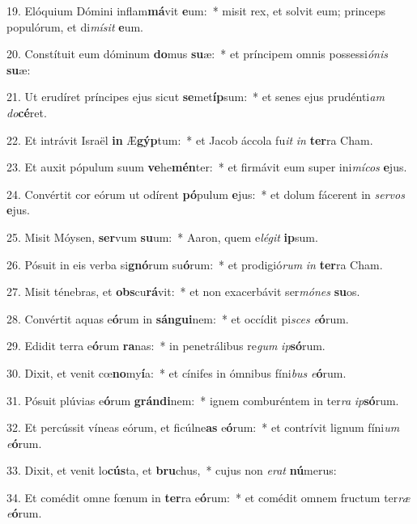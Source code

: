19. Elóquium Dómini inflam\textbf{má}vit \textbf{e}um:~*  misit rex, et solvit eum; princeps populórum, et di\textit{mí}\textit{sit} \textbf{e}um.\

20. Constítuit eum dóminum \textbf{do}mus \textbf{su}æ:~*  et príncipem omnis possessi\textit{ó}\textit{nis} \textbf{su}æ:\

21. Ut erudíret príncipes ejus sicut \textbf{se}met\textbf{íp}sum:~*  et senes ejus prudénti\textit{am} \textit{do}\textbf{cé}ret.\

22. Et intrávit Israël \textbf{in} Æ\textbf{gýp}tum:~*  et Jacob áccola fu\textit{it} \textit{in} \textbf{ter}ra Cham.\

23. Et auxit pópulum suum \textbf{ve}he\textbf{mén}ter:~*  et firmávit eum super ini\textit{mí}\textit{cos} \textbf{e}jus.\

24. Convértit cor eórum ut odírent \textbf{pó}pulum \textbf{e}jus:~*  et dolum fácerent in \textit{ser}\textit{vos} \textbf{e}jus.\

25. Misit Móysen, \textbf{ser}vum \textbf{su}um:~*  Aaron, quem e\textit{lé}\textit{git} \textbf{ip}sum.\

26. Pósuit in eis verba si\textbf{gnó}rum su\textbf{ó}rum:~*  et prodigió\textit{rum} \textit{in} \textbf{ter}ra Cham.\

27. Misit ténebras, et \textbf{obs}cu\textbf{rá}vit:~*  et non exacerbávit ser\textit{mó}\textit{nes} \textbf{su}os.\

28. Convértit aquas e\textbf{ó}rum in \textbf{sán}\textbf{gui}nem:~*  et occídit pi\textit{sces} \textit{e}\textbf{ó}rum.\

29. Edidit terra e\textbf{ó}rum \textbf{ra}nas:~*  in penetrálibus re\textit{gum} \textit{ip}\textbf{só}rum.\

30. Dixit, et venit cœ\textbf{no}my\textbf{í}a:~*  et cínifes in ómnibus fíni\textit{bus} \textit{e}\textbf{ó}rum.\

31. Pósuit plúvias e\textbf{ó}rum \textbf{grán}\textbf{di}nem:~*  ignem comburéntem in ter\textit{ra} \textit{ip}\textbf{só}rum.\

32. Et percússit víneas eórum, et ficúlne\textbf{as} e\textbf{ó}rum:~*  et contrívit lignum fíni\textit{um} \textit{e}\textbf{ó}rum.\

33. Dixit, et venit lo\textbf{cús}ta, et \textbf{bru}chus,~*  cujus non \textit{e}\textit{rat} \textbf{nú}merus:\

34. Et comédit omne fœnum in \textbf{ter}ra e\textbf{ó}rum:~*  et comédit omnem fructum ter\textit{ræ} \textit{e}\textbf{ó}rum.\

